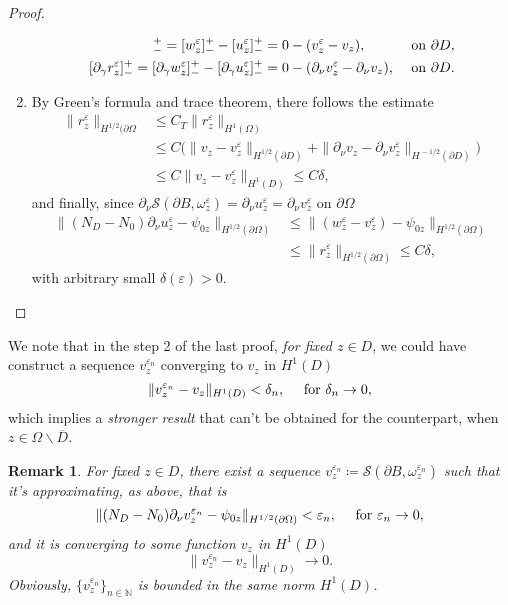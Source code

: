 \documentclass[10pt, a4paper, twoside, openright]{book}
\theoremstyle{definition}
\theoremstyle{plain}
\theoremstyle{plain}
\theoremstyle{plain}
\theoremstyle{plain}
\newtheorem{remark}[subsection]{Remark}
\theoremstyle{plain}
\theoremstyle{plain}
\theoremstyle{plain}
\theoremstyle{plain}
\let\epsilon\varepsilon
\begin{document}
\begin{proof}
\begin{enumerate}
  \begin{align}
   [r^\epsilon_z]^+_- = [w^\epsilon_z]^+_- -[u^\epsilon_z]^+_- &=0 - (v^\epsilon_z - v_z), && \textup{ on }\partial D, \\
   [\partial_\gamma r^\epsilon_z]^+_- = [\partial_\gamma w^\epsilon_z]^+_- -[\partial_\gamma u^\epsilon_z]^+_-&= 0 - (\partial_\nu v^\epsilon_z - \partial_\nu v_z), && \textup{ on }\partial D.
  \end{align}
  \item By Green's formula and trace theorem, there follows the estimate
  \begin{align}
   \|r^\epsilon_z\|_{H^{1/2}(\partial \Omega} & \leq C_T\|r^\epsilon_z\|_{H^1(\Omega)} \\
   & \leq C\bigl(\|v_z - v^\epsilon_z\|_{H^{1/2}(\partial D)} + \|\partial_\nu v_z - \partial_\nu v^\epsilon_z\|_{H^{\, -1/2}(\partial D)}\bigr) \\
   & \leq C \|v_z - v^\epsilon_z\|_{H^1(D)}\leq C\delta,
  \end{align}
  and finally, since $\partial_\nu\mathcal{S}(\partial B, \omega^\epsilon_z) = \partial_\nu u^\epsilon_z = \partial_\nu v^\epsilon_z$ on $\partial \Omega$
  \begin{align}
   \|({N_D} - {N_0})\partial_\nu u^\epsilon_z - \psi_{0z}\|_{H^{1/2}(\partial\Omega)} &\leq \|(w^\epsilon_z- v^\epsilon_z) - \psi_{0z}\|_{H^{1/2}(\partial\Omega)} \\
   &\leq\|r^\epsilon_z\|_{H^{1/2}(\partial \Omega)}\leq C\delta,
  \end{align}
  with arbitrary small $\delta(\epsilon)>0$.
 \end{enumerate}
\end{proof}
We note that in the step 2 of the last proof, \emph{for fixed $z \in D$}, we could have construct a sequence $v^{\epsilon_n}_z$ converging to $v_z$ in $H^1(D)$
\begin{equation}
 \|v^{\epsilon_n}_z - v_z\|_{H^1(D)} < \delta_n, \quad \textup{ for }\delta_n \to 0,
\end{equation}
which implies a \emph{stronger result} that can't be obtained for the counterpart, when $z\in\Omega\backslash\overline{D}$.
\begin{remark}
 For fixed $z\in D$, there exist a sequence $v^{\epsilon_n}_z\coloneqq\mathcal{S}(\partial B, \omega^{\epsilon_n}_z)$ such that it's approximating, as above, that is
\begin{equation}
 \|({N_D} - {N_0})\partial_\nu v^{\epsilon_n}_z - \psi_{0z}\|_{H^{1/2}(\partial\Omega)} < \epsilon_n, \quad \textup{ for }\epsilon_n\to 0,
\end{equation}
 and it is converging to some function $v_z$ in $H^1(D)$
\begin{equation}
 \|v^{\epsilon_n}_z - v_z\|_{H^1(D)} \to 0.
\end{equation}
 Obviously, $\{v^{\epsilon_n}_z\}_{n\in\mathbb{N}}$ is bounded in the same norm $H^1(D)$.
\end{remark}
\end{document}
